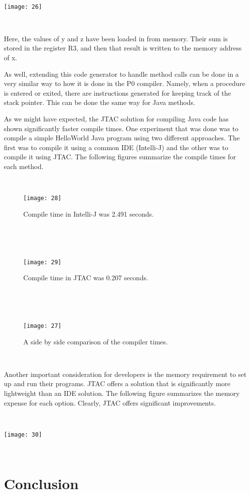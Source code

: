 \documentclass[11pt]{article}
\begin{document}
~
\begin{center}
\texttt{[image: 26]}
\end{center}
~

Here, the values of y and z have been loaded in from memory. Their sum is stored in the register R3, and then that result is written to the memory address of x. 

As well, extending this code generator to handle method calls can be done in a very similar way to how it is done in the P0 compiler. Namely, when a procedure is entered or exited, there are instructions generated for keeping track of the stack pointer. This can be done the same way for Java methods.

As we might have expected, the JTAC solution for compiling Java code has shown significantly faster compile times. One experiment that was done was to compile a simple HelloWorld Java program using two different approaches. The first was to compile it using a common IDE (Intelli-J) and the other was to compile it using JTAC. The following figures summarize the compile times for each method.

~
\begin{figure}[h]
\centering
\texttt{[image: 28]}
\caption{Compile time in Intelli-J was 2.491 seconds.}
\end{figure}
~

~
\begin{figure}[h]
\centering
\texttt{[image: 29]}
\caption{Compile time in JTAC was 0.207 seconds.}
\end{figure}
~

~
\begin{figure}[h]
\centering
\texttt{[image: 27]}
\caption{A side by side comparison of the compiler times.}
\end{figure}
~

Another important consideration for developers is the memory requirement to set up and run their programs. JTAC offers a solution that is significantly more lightweight than an IDE solution. The following figure summarizes the memory expense for each option. Clearly, JTAC offers significant improvements.

~
\begin{center}
\texttt{[image: 30]}
\end{center}
~

\section{Conclusion}
\end{document}
